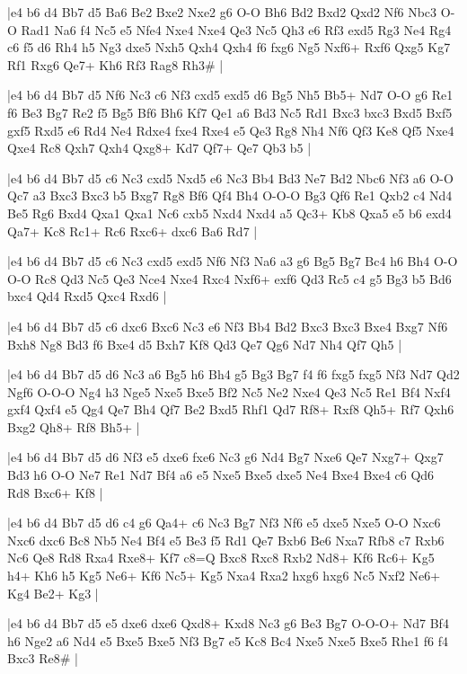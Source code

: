 \whitename{}
\blackname{}
\makegametitle
|e4 b6 d4 Bb7 d5 Ba6 Be2 Bxe2 Nxe2 g6 O-O Bh6 Bd2 Bxd2 Qxd2 Nf6 Nbc3 O-O Rad1 Na6 f4 Nc5 e5 Nfe4 Nxe4 Nxe4 Qe3 Nc5 Qh3 e6 Rf3 exd5 Rg3 Ne4 Rg4 c6 f5 d6 Rh4 h5 Ng3 dxe5 Nxh5 Qxh4 Qxh4 f6 fxg6 Ng5 Nxf6+ Rxf6 Qxg5 Kg7 Rf1 Rxg6 Qe7+ Kh6 Rf3 Rag8 Rh3\#  |

\whitename{}
\blackname{}
\makegametitle
|e4 b6 d4 Bb7 d5 Nf6 Nc3 c6 Nf3 cxd5 exd5 d6 Bg5 Nh5 Bb5+ Nd7 O-O g6 Re1 f6 Be3 Bg7 Re2 f5 Bg5 Bf6 Bh6 Kf7 Qe1 a6 Bd3 Nc5 Rd1 Bxc3 bxc3 Bxd5 Bxf5 gxf5 Rxd5 e6 Rd4 Ne4 Rdxe4 fxe4 Rxe4 e5 Qe3 Rg8 Nh4 Nf6 Qf3 Ke8 Qf5 Nxe4 Qxe4 Rc8 Qxh7 Qxh4 Qxg8+ Kd7 Qf7+ Qe7 Qb3 b5  |

\whitename{}
\blackname{}
\makegametitle
|e4 b6 d4 Bb7 d5 c6 Nc3 cxd5 Nxd5 e6 Nc3 Bb4 Bd3 Ne7 Bd2 Nbc6 Nf3 a6 O-O Qc7 a3 Bxc3 Bxc3 b5 Bxg7 Rg8 Bf6 Qf4 Bh4 O-O-O Bg3 Qf6 Re1 Qxb2 c4 Nd4 Be5 Rg6 Bxd4 Qxa1 Qxa1 Nc6 cxb5 Nxd4 Nxd4 a5 Qc3+ Kb8 Qxa5 e5 b6 exd4 Qa7+ Kc8 Rc1+ Rc6 Rxc6+ dxc6 Ba6 Rd7  |

\whitename{}
\blackname{}
\makegametitle
|e4 b6 d4 Bb7 d5 c6 Nc3 cxd5 exd5 Nf6 Nf3 Na6 a3 g6 Bg5 Bg7 Bc4 h6 Bh4 O-O O-O Rc8 Qd3 Nc5 Qe3 Nce4 Nxe4 Rxc4 Nxf6+ exf6 Qd3 Rc5 c4 g5 Bg3 b5 Bd6 bxc4 Qd4 Rxd5 Qxc4 Rxd6  |

\whitename{}
\blackname{}
\makegametitle
|e4 b6 d4 Bb7 d5 c6 dxc6 Bxc6 Nc3 e6 Nf3 Bb4 Bd2 Bxc3 Bxc3 Bxe4 Bxg7 Nf6 Bxh8 Ng8 Bd3 f6 Bxe4 d5 Bxh7 Kf8 Qd3 Qe7 Qg6 Nd7 Nh4 Qf7 Qh5  |

\whitename{}
\blackname{}
\makegametitle
|e4 b6 d4 Bb7 d5 d6 Nc3 a6 Bg5 h6 Bh4 g5 Bg3 Bg7 f4 f6 fxg5 fxg5 Nf3 Nd7 Qd2 Ngf6 O-O-O Ng4 h3 Nge5 Nxe5 Bxe5 Bf2 Nc5 Ne2 Nxe4 Qe3 Nc5 Re1 Bf4 Nxf4 gxf4 Qxf4 e5 Qg4 Qe7 Bh4 Qf7 Be2 Bxd5 Rhf1 Qd7 Rf8+ Rxf8 Qh5+ Rf7 Qxh6 Bxg2 Qh8+ Rf8 Bh5+  |

\whitename{}
\blackname{}
\makegametitle
|e4 b6 d4 Bb7 d5 d6 Nf3 e5 dxe6 fxe6 Nc3 g6 Nd4 Bg7 Nxe6 Qe7 Nxg7+ Qxg7 Bd3 h6 O-O Ne7 Re1 Nd7 Bf4 a6 e5 Nxe5 Bxe5 dxe5 Ne4 Bxe4 Bxe4 c6 Qd6 Rd8 Bxc6+ Kf8  |

\whitename{}
\blackname{}
\makegametitle
|e4 b6 d4 Bb7 d5 d6 c4 g6 Qa4+ c6 Nc3 Bg7 Nf3 Nf6 e5 dxe5 Nxe5 O-O Nxc6 Nxc6 dxc6 Bc8 Nb5 Ne4 Bf4 e5 Be3 f5 Rd1 Qe7 Bxb6 Be6 Nxa7 Rfb8 c7 Rxb6 Nc6 Qe8 Rd8 Rxa4 Rxe8+ Kf7 c8=Q Bxc8 Rxc8 Rxb2 Nd8+ Kf6 Rc6+ Kg5 h4+ Kh6 h5 Kg5 Ne6+ Kf6 Nc5+ Kg5 Nxa4 Rxa2 hxg6 hxg6 Nc5 Nxf2 Ne6+ Kg4 Be2+ Kg3  |

\whitename{}
\blackname{}
\makegametitle
|e4 b6 d4 Bb7 d5 e5 dxe6 dxe6 Qxd8+ Kxd8 Nc3 g6 Be3 Bg7 O-O-O+ Nd7 Bf4 h6 Nge2 a6 Nd4 e5 Bxe5 Bxe5 Nf3 Bg7 e5 Kc8 Bc4 Nxe5 Nxe5 Bxe5 Rhe1 f6 f4 Bxc3 Re8\#  |

